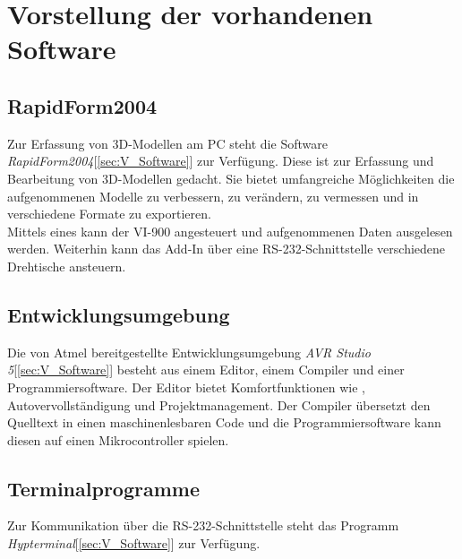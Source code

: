 \chapter{Vorstellung der vorhandenen Software}
\label{cha:Software}

\section{RapidForm2004}
\label{sec:RapidForm}
Zur Erfassung von 3D-Modellen am PC steht die Software \emph{RapidForm2004}[\ref{sec:V_Software}] zur Verfügung. Diese ist zur Erfassung und Bearbeitung von 3D-Modellen gedacht. Sie bietet umfangreiche Möglichkeiten die aufgenommenen Modelle zu verbessern, zu verändern, zu vermessen und in verschiedene Formate zu exportieren.\\
Mittels eines  kann der VI-900 angesteuert und aufgenommenen Daten ausgelesen werden. Weiterhin kann das Add-In über eine RS-232-Schnittstelle verschiedene Drehtische ansteuern.

\section{Entwicklungsumgebung}
\label{sec:Entwicklungsumgebung}
Die von Atmel bereitgestellte Entwicklungsumgebung \emph{AVR Studio 5}[\ref{sec:V_Software}] besteht aus einem Editor, einem Compiler und einer Programmiersoftware. Der Editor bietet Komfortfunktionen wie , Autovervollständigung und Projektmanagement. Der Compiler übersetzt den Quelltext in einen maschinenlesbaren Code und die Programmiersoftware kann diesen auf einen Mikrocontroller spielen.

\section{Terminalprogramme}
\label{sec:Terminal}
Zur Kommunikation über die RS-232-Schnittstelle steht das Programm \emph{Hypterminal}[\ref{sec:V_Software}] zur Verfügung.

